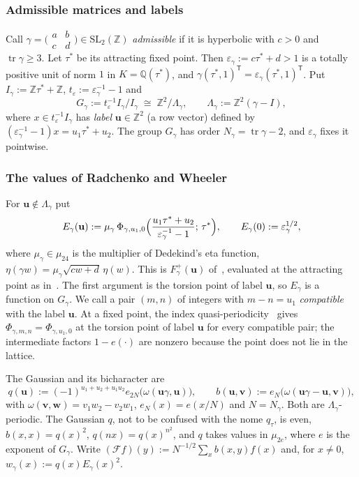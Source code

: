 \documentclass[11pt]{amsart}
\numberwithin{equation}{section}
\theoremstyle{plain}
\theoremstyle{definition}
\theoremstyle{remark}
\begin{document}
\subsubsection*{Admissible matrices and labels}
Call \(\gamma=\bigl(\begin{smallmatrix}a&b\\c&d\end{smallmatrix}\bigr)\in\mathrm{SL}_2(\mathbb Z)\) \emph{admissible} if it is hyperbolic with \(c>0\) and \(\operatorname{tr}\gamma\ge3\). Let \(\tau^*\) be its attracting fixed point. Then \(\varepsilon_\gamma:=c\tau^*+d>1\) is a totally positive unit of norm \(1\) in \(K=\mathbb Q(\tau^*)\), and \(\gamma(\tau^*,1)^{\mathsf T}=\varepsilon_\gamma(\tau^*,1)^{\mathsf T}\). Put \(I_\gamma:=\mathbb Z\tau^*+\mathbb Z\), \(t_\varepsilon:=\varepsilon_\gamma^{-1}-1\) and
\[G_\gamma:=t_\varepsilon^{-1}I_\gamma/I_\gamma\;\cong\;\mathbb Z^2/\Lambda_\gamma,\qquad\Lambda_\gamma:=\mathbb Z^2(\gamma-I),\]
where \(x\in t_\varepsilon^{-1}I_\gamma\) has \emph{label} \(\mathbf u\in\mathbb Z^2\) (a row vector) defined by \((\varepsilon_\gamma^{-1}-1)x=u_1\tau^*+u_2\). The group \(G_\gamma\) has order \(N_\gamma=\operatorname{tr}\gamma-2\), and \(\varepsilon_\gamma\) fixes it pointwise.

\subsubsection*{The values of Radchenko and Wheeler}
For \(\mathbf u\notin\Lambda_\gamma\) put
\[E_\gamma(\mathbf u):=\mu_\gamma\,\Phi_{\gamma,u_1,0}\Bigl(\frac{u_1\tau^*+u_2}{\varepsilon_\gamma^{-1}-1};\,\tau^*\Bigr),\qquad E_\gamma(0):=\varepsilon_\gamma^{1/2},\]
where \(\mu_\gamma\in\mu_{24}\) is the multiplier of Dedekind's eta function, \(\eta(\gamma w)=\mu_\gamma\sqrt{cw+d}\,\eta(w)\). This is \(F^+_\gamma(\mathbf u)\) of~\cite[(2), (4)]{RW}, evaluated at the attracting point as in~\cite[(37)]{RW}. The first argument is the torsion point of label \(\mathbf u\), so \(E_\gamma\) is a function on \(G_\gamma\). We call a pair \((m,n)\) of integers with \(m-n=u_1\) \emph{compatible} with the label \(\mathbf u\). At a fixed point, the index quasi-periodicity~\cite[(16)]{RW} gives \(\Phi_{\gamma,m,n}=\Phi_{\gamma,u_1,0}\) at the torsion point of label \(\mathbf u\) for every compatible pair; the intermediate factors \(1-e(\cdot)\) are nonzero because the point does not lie in the lattice.

The Gaussian and its bicharacter are~\cite[(3)]{RW}
\[q(\mathbf u):=(-1)^{u_1+u_2+u_1u_2}e_{2N}\bigl(\omega(\mathbf u\gamma,\mathbf u)\bigr),\qquad b(\mathbf u,\mathbf v):=e_N\bigl(\omega(\mathbf u\gamma-\mathbf u,\mathbf v)\bigr),\]
with \(\omega(\mathbf v,\mathbf w)=v_1w_2-v_2w_1\), \(e_N(x)=e(x/N)\) and \(N=N_\gamma\). Both are \(\Lambda_\gamma\)-periodic. The Gaussian \(q\), not to be confused with the nome \(q_\tau\), is even, \(b(x,x)=q(x)^2\), \(q(nx)=q(x)^{n^2}\), and \(q\) takes values in \(\mu_{2e}\), where \(e\) is the exponent of \(G_\gamma\). Write \((\mathcal Ff)(y):=N^{-1/2}\sum_{x}b(x,y)f(x)\) and, for \(x\ne0\), \(w_\gamma(x):=q(x)E_\gamma(x)^2\).
\end{document}
